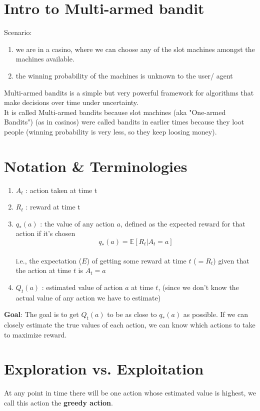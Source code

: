\section{Intro to Multi-armed bandit}
Scenario: 
\begin{enumerate}
    \item we are in a casino, where we can choose any of the slot machines amongst the machines available.
    \item the winning probability of the machines is unknown to the user/ agent
\end{enumerate}
Multi-armed bandits is a simple but very powerful framework for algorithms that make decisions over time under uncertainty.\\
It is called Multi-armed bandits because slot machines (aka "One-armed Bandits") (as in casinos) were called bandits in earlier times because they loot people (winning probability is very less, so they keep loosing money).

\section{Notation \& Terminologies \cite{medium-numsmt2-rl-ch2-part-1}}
\begin{enumerate}
    \item $A_t$ : action taken at time t
    \item $R_t$ : reward at time t
    \item $q_*(a)$ : the value of any action $a$, defined as the expected reward for that action if it’s chosen \[
        q_*(a) = \mathbb{E}[R_t | A_t = a]
    \]\\[-0.5cm]
    i.e., the expectation ($E$) of getting some reward at time $t$ ($=R_t$) given that the action at time $t$ is $A_t = a$
    \item $Q_t(a)$ : estimated value of action $a$ at time $t$, (since we don’t know the actual value of any action we have to estimate)
\end{enumerate}

\vspace{0.2cm}
\noindent\textbf{Goal}: The goal is to get $Q_t(a)$ to be as close to $q_*(a)$ as possible. If we can closely estimate the true values of each action, we can know which actions to take to maximize reward.

\section{Exploration vs. Exploitation \cite{medium-numsmt2-rl-ch2-part-1}}\label{Exploration vs. Exploitation}
At any point in time there will be one action whose estimated value is highest, we call this action the \textbf{greedy action}.

